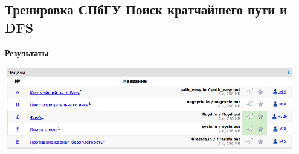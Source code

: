 \documentclass[a4paper,12pt]{article}
\begin{document}
%
%
\newpage
\subsection{Тренировка СПбГУ Поиск кратчайшего пути и DFS}

\textbf{{\large Результаты}} \\
\begin{center}
\includegraphics[width=0.95\textwidth]{SPBGU_GRAPHS/SPBGU_GRAPHS_result.png}\\ [1cm]
\end{center}
\end{document}
